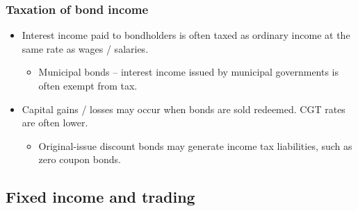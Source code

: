 \documentclass[../notes_compiled.tex]{subfiles}
\begin{document}
\subsubsection{Taxation of bond income}
\begin{itemize}
\item Interest income paid to bondholders is often taxed as ordinary income at the same rate as wages / salaries.
\begin{itemize}
\item Municipal bonds -- interest income issued by municipal governments is often exempt from tax.
\end{itemize}
\item Capital gains / losses may occur when bonds are sold redeemed. CGT rates are often lower.
\begin{itemize}
\item Original-issue discount bonds may generate income tax liabilities, such as zero coupon bonds.
\end{itemize}
\end{itemize}

\subsection{Fixed income and trading}
\end{document}
